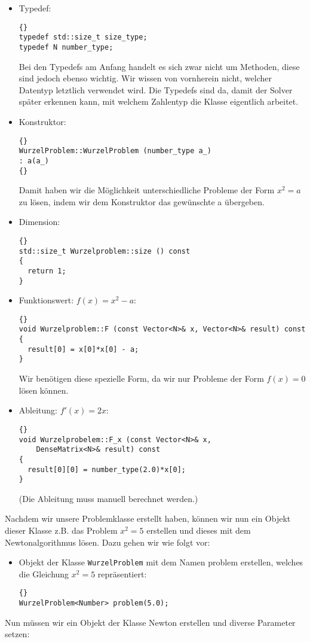 \documentclass[a4paper,11pt]{article}
\theoremstyle{definition}
\begin{document}
\begin{itemize}
	\item Typedef:
{\footnotesize{\begin{lstlisting}{}
typedef std::size_t size_type;
typedef N number_type;
		\end{lstlisting}}}
Bei den Typedefs am Anfang handelt es sich zwar nicht um Methoden, diese sind jedoch ebenso wichtig. Wir wissen von vornherein nicht, welcher Datentyp letztlich verwendet wird. Die Typedefs sind da, damit der Solver später erkennen kann, mit welchem Zahlentyp die Klasse eigentlich arbeitet.
  \item Konstruktor:
  {\footnotesize{\begin{lstlisting}{}
WurzelProblem::WurzelProblem (number_type a_)
: a(a_)
{}
      \end{lstlisting}}}
  Damit haben wir die Möglichkeit unterschiedliche Probleme der Form $x^2=a$ zu lösen, indem wir dem Konstruktor das gewünschte a übergeben.
  \item Dimension:
    {\footnotesize{\begin{lstlisting}{}
std::size_t Wurzelproblem::size () const
{
  return 1;
}
        \end{lstlisting}}}
  
  \item Funktionswert: $f(x)=x^2-a$:
    {\footnotesize{\begin{lstlisting}{}
void Wurzelproblem::F (const Vector<N>& x, Vector<N>& result) const
{
  result[0] = x[0]*x[0] - a;
}
        \end{lstlisting}}}
Wir benötigen diese spezielle Form, da wir nur Probleme der Form $f(x)=0$ lösen können.
  \item Ableitung: $f'(x)=2x$:
    {\footnotesize{\begin{lstlisting}{}
void Wurzelprobelem::F_x (const Vector<N>& x,
    DenseMatrix<N>& result) const
{
  result[0][0] = number_type(2.0)*x[0];
}
        \end{lstlisting}}}
    (Die Ableitung muss manuell berechnet werden.)
\end{itemize}
Nachdem wir unsere Problemklasse erstellt haben, können wir nun ein Objekt dieser Klasse z.B. das Problem $x^2=5$ erstellen und dieses mit dem Newtonalgorithmus lösen. Dazu gehen wir wie folgt vor:
\begin{itemize}
  \item Objekt der Klasse \lstinline{WurzelProblem} mit dem Namen \glqq problem\grqq{} erstellen, welches die Gleichung $x^2=5$ repräsentiert:
  {\footnotesize{\begin{lstlisting}{}
WurzelProblem<Number> problem(5.0);
      \end{lstlisting}}}
\end{itemize}
Nun müssen wir ein Objekt der Klasse Newton erstellen und diverse Parameter setzen:
\end{document}
